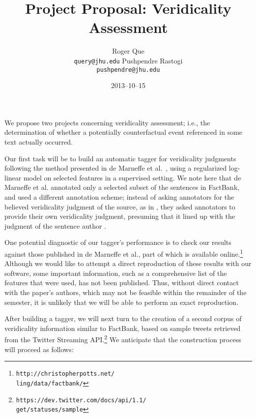 \documentclass[11pt,letterpaper]{article}
\title{Project Proposal: Veridicality Assessment}
\author{
    Roger Que\\
    {\tt query@jhu.edu}
    \And
    Pushpendre Rastogi\\
    {\tt pushpendre@jhu.edu}}
\date{2013--10--15}
\begin{document}
\maketitle


We propose two projects concerning veridicality assessment; i.e., the
determination of whether a potentially counterfactual event referenced
in some text actually occurred.

Our first task will be to build an automatic tagger for veridicality
judgments following the method presented in de Marneffe et
al.~, using a regularized log-linear model on
selected features in a supervised setting.
We note here that de Marneffe et al. annotated only a selected subset of
the sentences in FactBank, and used a different annotation scheme;
instead of asking annotators for the believed veridicality judgment of
the source, as in \cite{sauri2009factbank}, they asked annotators to
provide their own veridicality judgment, presuming that it lined up with
the judgment of the sentence author \cite[306]{de2012did}.

One potential diagnostic of our tagger's performance is to check our
results against those published in de Marneffe et al., part of which is
available online.\footnote{
\texttt{http://christopherpotts.net/\\ling/data/factbank/}}
Although we would like to attempt a direct reproduction of these results
with our software, some important information, such as a comprehensive
list of the features that were used, has not been published.
Thus, without direct contact with the paper's authors, which may not be
feasible within the remainder of the semester, it is unlikely that we
will be able to perform an exact reproduction.

After building a tagger, we will next turn to the creation of a second
corpus of veridicality information similar to FactBank, based on sample
tweets retrieved from the Twitter Streaming API.\footnote{
\texttt{https://dev.twitter.com/docs/api/1.1/\\get/statuses/sample}}
We anticipate that the construction process will proceed as follows:
\end{document}
